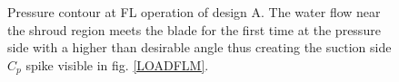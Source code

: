 \begin{figure}[h!]
\begin{minipage}[b]{1\linewidth}
 \centering
\end{minipage}
\caption{Pressure contour at FL operation of design A. The water flow near the shroud region meets the blade for the first time at the pressure side with a higher than desirable angle thus creating the suction side $C_p$ spike visible in fig. \ref{LOADFLM}. }
\label{design-FL-M}
\end{figure}


